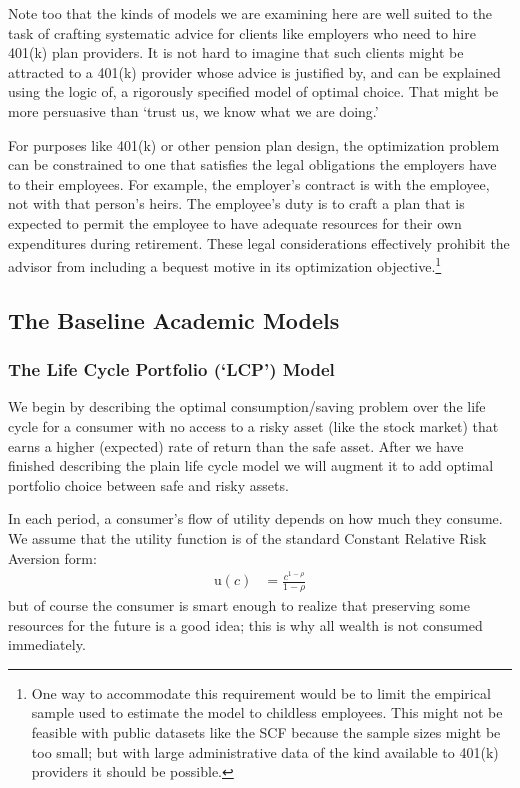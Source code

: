 \documentclass{article}
\newcommand{\CRRA}{\rho}
\newcommand{\uFunc}{\mathrm{u}}
\begin{document}
Note too that the kinds of models we are examining here are well suited to the task of crafting systematic advice for clients like employers who need to hire 401(k) plan providers. It is not hard to imagine that such clients might be attracted to a 401(k) provider whose advice is justified by, and can be explained using the logic of, a rigorously specified model of optimal choice.  That might be more persuasive than `trust us, we know what we are doing.'

For purposes like 401(k) or other pension plan design, the optimization problem can be constrained to one that satisfies the legal obligations the employers have to their employees. For example, the employer's contract is with the employee, not with that person's heirs. The employee's duty is to craft a plan that is expected to permit the employee to have adequate resources for their own expenditures during retirement. These legal considerations effectively prohibit the advisor from including a bequest motive in its optimization objective.\footnote{One way to accommodate this requirement would be to limit the empirical sample used to estimate the model to childless employees. This might not be feasible with public datasets like the SCF because the sample sizes might be too small; but with large administrative data of the kind available to 401(k) providers it should be possible.}

\subsection{The Baseline Academic Models}

\subsubsection{The Life Cycle Portfolio (`LCP') Model}

We begin by describing the optimal consumption/saving problem over the life cycle for a consumer with no access to a risky asset (like the stock market) that earns a higher (expected) rate of return than the safe asset. After we have finished describing the plain life cycle model we will augment it to add optimal portfolio choice between safe and risky assets.

In each period, a consumer's flow of utility depends on how much they consume. We assume that the utility function is of the standard Constant Relative Risk Aversion form:
\begin{align}
    \uFunc(c) & = \frac{c^{1-\CRRA}}{1-\CRRA}
\end{align}
but of course the consumer is smart enough to realize that preserving some resources for the future is a good idea; this is why all wealth is not consumed immediately.
\end{document}
